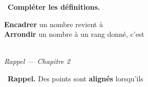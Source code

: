 \documentclass[a4paper,11pt]{article}
\newcommand{\bl}[1][4cm]{\,\makebox[#1]{\dotfill}\,}
\newcommand{\coeur}{\textcolor{Couleur8}{\faHeart}\ }
\newcommand{\coeurrappel}{\textcolor{Couleur6}{\faHeart}\ }
\begin{document}
\noindent \coeur \textbf{Compl\'eter les d\'efinitions.}
\begin{mdframed}[linecolor=Couleur6,linewidth=4pt,topline=false,bottomline=false,rightline=false,backgroundcolor=Couleur6!10,innerleftmargin=8pt,innertopmargin=6pt,innerbottommargin=6pt]
\textbf{Encadrer} un nombre revient \`a \bl[7cm]\dotfill\\[4pt]
\textbf{Arrondir} un nombre \`a un rang donn\'e, c'est \bl[7cm]\dotfill
\end{mdframed}

\vspace{0.3cm}
\noindent{\textcolor{Couleur8}{\rule{\textwidth}{0.5pt}}}\\
{\small\textit{\textcolor{Couleur8}{Rappel --- Chapitre 2}}}
\vspace{0.1cm}

\noindent \coeurrappel \textbf{Rappel.} Des points sont \textbf{align\'es} lorsqu'ils \dotfill
\end{document}
